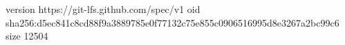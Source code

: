 version https://git-lfs.github.com/spec/v1
oid sha256:d5ec841c8cd88f9a3889785e0f77132c75e855c0906516995d8e3267a2bc99c6
size 12504
